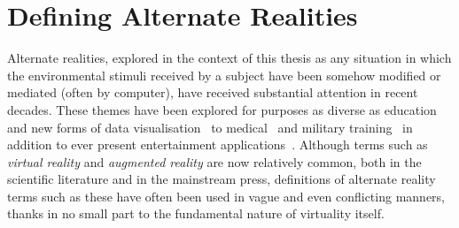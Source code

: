 



\section{Defining Alternate Realities}

Alternate realities, explored in the context of this thesis as any situation in which the environmental stimuli received by a subject have been somehow modified or mediated (often by computer), have received substantial attention in recent decades. These themes have been explored for purposes as diverse as education~\cite{Warburton2009} and new forms of data visualisation~\cite{Coleman2009} to medical~\cite{TenEyck2011} and military training~\cite{Qiu2009} in addition to ever present entertainment applications~\cite{Scherrer2008}. Although terms such as \textit{virtual reality} and \textit{augmented reality} are now relatively common, both in the scientific literature and in the mainstream press, definitions of alternate reality terms such as these have often been used in vague and even conflicting manners, thanks in no small part to the fundamental nature of virtuality itself.

